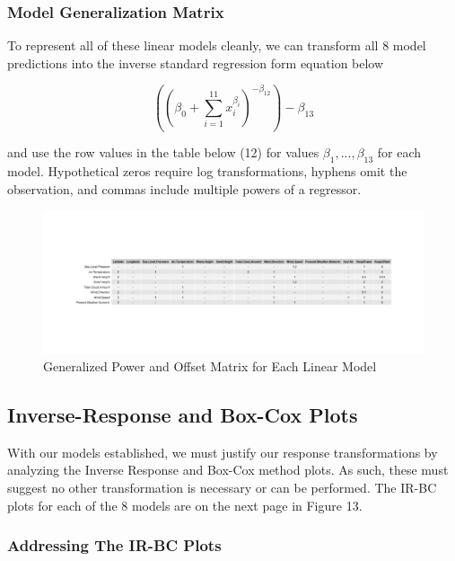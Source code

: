 \documentclass{article}
\begin{document}
\subsubsection{Model Generalization Matrix}

To represent all of these linear models cleanly, we can transform all 8 model predictions into the inverse standard regression form equation below

\begin{equation}
    ((\beta_{0} + \sum_{i=1}^{11} x_i^{\beta_{i}})^{-\beta_{12}}) - \beta_{13}
\end{equation}

and use the row values in the table below (12) for values $\beta_1, ..., \beta_{13}$ for each model. Hypothetical zeros require log transformations, hyphens omit the observation, and commas include multiple powers of a regressor.

\newpage

\begin{figure}[h]
    \centering
    \includegraphics[scale = 0.27]{volume/regressorResponseOffsetMatrix.png}
    \caption{Generalized Power and Offset Matrix for Each Linear Model}
    \label{fig:GenLinModMatrix}
\end{figure}

\subsection{Inverse-Response and Box-Cox Plots}

With our models established, we must justify our response transformations by analyzing the Inverse Response and Box-Cox method plots. As such, these must suggest no other transformation is necessary or can be performed. The IR-BC plots for each of the 8 models are on the next page in Figure 13.

\subsubsection*{Addressing The IR-BC Plots}
\end{document}
